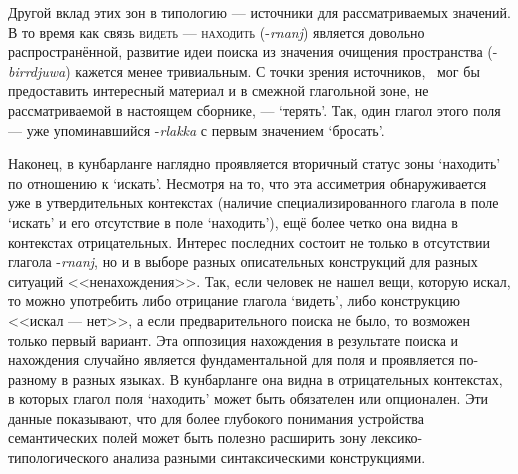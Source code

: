 Другой вклад этих зон в типологию --- источники для рассматриваемых значений. В то время как связь \textsc{видеть} --- \textsc{находить} (-\textit{rnanj}) является довольно распространённой, развитие идеи поиска из значения очищения пространства (-\textit{birrdjuwa}) кажется менее тривиальным. С точки зрения источников, \  мог бы предоставить интересный материал и в смежной глагольной зоне, не рассматриваемой в настоящем сборнике, --- `терять'. Так, один глагол этого поля --- уже упоминавшийся -\textit{rlakka} с первым значением `бросать'.

Наконец, в кунбарланге наглядно проявляется вторичный статус зоны `находить' по отношению к `искать'. Несмотря на то, что эта ассиметрия обнаруживается уже в утвердительных контекстах (наличие специализированного глагола в поле `искать' и его отсутствие в поле `находить'), ещё более четко она видна в контекстах отрицательных. Интерес последних состоит не только в отсутствии глагола -\textit{rnanj}, но и в выборе разных описательных конструкций для разных ситуаций <<ненахождения>>. Так, если человек не нашел вещи, которую искал, то можно употребить либо отрицание глагола `видеть', либо конструкцию <<искал --- нет>>, а если предварительного поиска не было, то возможен только первый вариант. Эта оппозиция нахождения в результате поиска и нахождения случайно является фундаментальной для поля и проявляется по-разному в разных языках. В кунбарланге она видна в отрицательных контекстах, в которых  глагол поля `находить' может быть обязателен или опционален. Эти данные показывают, что для более глубокого понимания устройства семантических полей может быть полезно расширить зону лексико-типологического анализа разными синтаксическими конструкциями.



